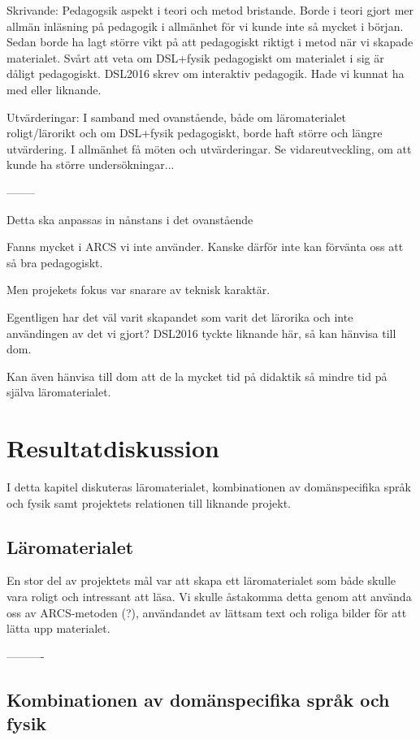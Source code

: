 \begin{binge}
Skrivande: Pedagogsik aspekt i teori och metod bristande. Borde i teori gjort
mer allmän inläsning på pedagogik i allmänhet för vi kunde inte så mycket i
början. Sedan borde ha lagt större vikt på att pedagogiskt riktigt i metod när
vi skapade materialet. Svårt att veta om DSL+fysik pedagogiskt om materialet i
sig är dåligt pedagogiskt. DSL2016 skrev om interaktiv pedagogik. Hade vi kunnat
ha med eller liknande.

Utvärderingar: I samband med ovanstående, både om läromaterialet roligt/lärorikt
och om DSL+fysik pedagogiskt, borde haft större och längre utvärdering. I
allmänhet få möten och utvärderingar. Se vidareutveckling, om att kunde ha
större undersökningar...

--------

Detta ska anpassas in nånstans i det ovanstående

Fanns mycket i ARCS vi inte använder. Kanske därför inte kan förvänta oss att så
bra pedagogiskt.

Men projekets fokus var snarare av teknisk karaktär.

Egentligen har det väl varit skapandet som varit det lärorika och inte
användingen av det vi gjort? DSL2016 tyckte liknande här, så kan hänvisa till
dom.

Kan även hänvisa till dom att de la mycket tid på didaktik så mindre tid på
själva läromaterialet.

\section{Resultatdiskussion}

I detta kapitel diskuteras läromaterialet, kombinationen av domänspecifika språk
och fysik samt projektets relationen till liknande projekt.

\subsection{Läromaterialet}

En stor del av projektets mål var att skapa ett läromaterialet som både skulle
vara roligt och intressant att läsa. Vi skulle åstakomma detta genom att använda
oss av ARCS-metoden (?), användandet av lättsam text och roliga bilder för att
lätta upp materialet. 


----------

\subsection{Kombinationen av domänspecifika språk och fysik}


\end{binge}
